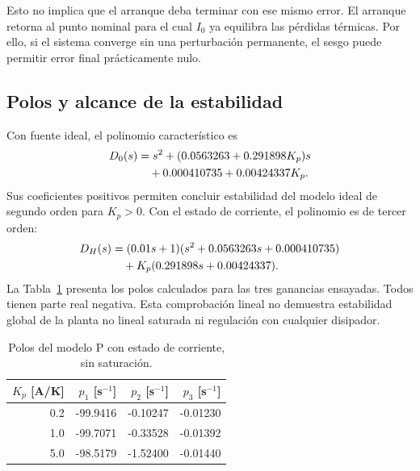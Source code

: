 \documentclass[journal,twocolumn]{IEEEtran}
\begin{document}
Esto no implica que el arranque deba terminar con ese mismo error. El arranque retorna al punto nominal para el cual $I_0$ ya equilibra las pérdidas térmicas. Por ello, si el sistema converge sin una perturbación permanente, el sesgo puede permitir error final prácticamente nulo.

\subsection{Polos y alcance de la estabilidad}
Con fuente ideal, el polinomio característico es
\begin{align}
D_0(s)&=s^2+(0.0563263+0.291898K_p)s\notag\\
&\quad+0.000410735+0.00424337K_p.\label{eq:carP}
\end{align}
Sus coeficientes positivos permiten concluir estabilidad del modelo ideal de segundo orden para $K_p>0$. Con el estado de corriente, el polinomio es de tercer orden:
\begin{align}
D_H(s)&=(0.01s+1)(s^2+0.0563263s+0.000410735)\notag\\
&\quad+K_p(0.291898s+0.00424337).
\end{align}
La Tabla~\ref{tab:polos} presenta los polos calculados para las tres ganancias ensayadas. Todos tienen parte real negativa. Esta comprobación lineal no demuestra estabilidad global de la planta no lineal saturada ni regulación con cualquier disipador.

\begin{table}[!tbp]\centering
\caption{Polos del modelo P con estado de corriente, sin saturación.}
\label{tab:polos}
\footnotesize
\begin{tabular}{@{}rrrr@{}}\toprule
$K_p$ [A/K] & $p_1$ [s$^{-1}$] & $p_2$ [s$^{-1}$] & $p_3$ [s$^{-1}$]\\\midrule
0.2 & -99.9416 & -0.10247 & -0.01230 \\
1.0 & -99.7071 & -0.33528 & -0.01392 \\
5.0 & -98.5179 & -1.52400 & -0.01440 \\
\bottomrule\end{tabular}
\end{table}
\end{document}

